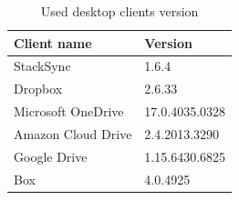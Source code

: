\begin{table}
    \centering
    \begin{tabular}{ | l | l | }
    \hline
    Client name & Version \\ \hline
    StackSync & 1.6.4 \\
    Dropbox & 2.6.33 \\
    Microsoft OneDrive & 17.0.4035.0328 \\
    Amazon Cloud Drive & 2.4.2013.3290 \\ 
    Google Drive & 1.15.6430.6825 \\ 
    Box & 4.0.4925 \\ \hline
    \end{tabular}
    \caption{Used desktop clients version}
    \label{table:clients}
\end{table}




